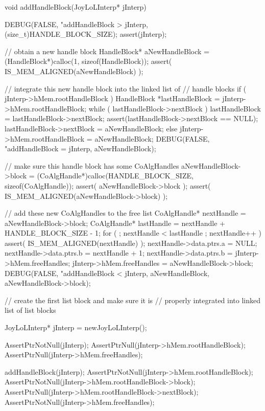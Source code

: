 \startCCode
void addHandleBlock(JoyLoLInterp* jInterp) {
  DEBUG(FALSE, "addHandleBlock > %
    jInterp, (size_t)HANDLE_BLOCK_SIZE);
  assert(jInterp);
  
  // obtain a new handle block
  HandleBlock* aNewHandleBlock = 
    (HandleBlock*)calloc(1, sizeof(HandleBlock));
  assert( IS_MEM_ALIGNED(aNewHandleBlock) );

  // integrate this new handle block into the linked list of
  // handle blocks
  if ( jInterp->hMem.rootHandleBlock ) {
    HandleBlock *lastHandleBlock = jInterp->hMem.rootHandleBlock;
    while ( lastHandleBlock->nextBlock ) {
      lastHandleBlock = lastHandleBlock->nextBlock;
    }
    assert(lastHandleBlock->nextBlock == NULL);
    lastHandleBlock->nextBlock = aNewHandleBlock;
  } else {
    jInterp->hMem.rootHandleBlock = aNewHandleBlock;
  }
  DEBUG(FALSE, "addHandleBlock = %
    jInterp, aNewHandleBlock);

  // make sure this handle block has some CoAlgHandles
  aNewHandleBlock->block = 
    (CoAlgHandle*)calloc(HANDLE_BLOCK_SIZE, sizeof(CoAlgHandle));
  assert( aNewHandleBlock->block );
  assert( IS_MEM_ALIGNED(aNewHandleBlock->block) );

  // add these new CoAlgHandles to the free list
  CoAlgHandle* nextHandle = aNewHandleBlock->block;
  CoAlgHandle* lastHandle = nextHandle + HANDLE_BLOCK_SIZE - 1;
  for ( ; nextHandle < lastHandle ; nextHandle++ ) {
    assert( IS_MEM_ALIGNED(nextHandle) );
    nextHandle->data.ptrs.a = NULL;
    nextHandle->data.ptrs.b = nextHandle + 1;
  }
  nextHandle->data.ptrs.b = jInterp->hMem.freeHandles;
  jInterp->hMem.freeHandles = aNewHandleBlock->block;
  DEBUG(FALSE, "addHandleBlock < %
    jInterp, aNewHandleBlock, aNewHandleBlock->block);
}
\stopCCode

\startCTest
  // create the first list block and make sure it is 
  // properly integrated into linked list of list blocks

  JoyLoLInterp* jInterp = newJoyLoLInterp();

  AssertPtrNotNull(jInterp);
  AssertPtrNull(jInterp->hMem.rootHandleBlock);
  AssertPtrNull(jInterp->hMem.freeHandles);

  addHandleBlock(jInterp);
  AssertPtrNotNull(jInterp->hMem.rootHandleBlock);
  AssertPtrNotNull(jInterp->hMem.rootHandleBlock->block);
  AssertPtrNull(jInterp->hMem.rootHandleBlock->nextBlock);
  AssertPtrNotNull(jInterp->hMem.freeHandles);

